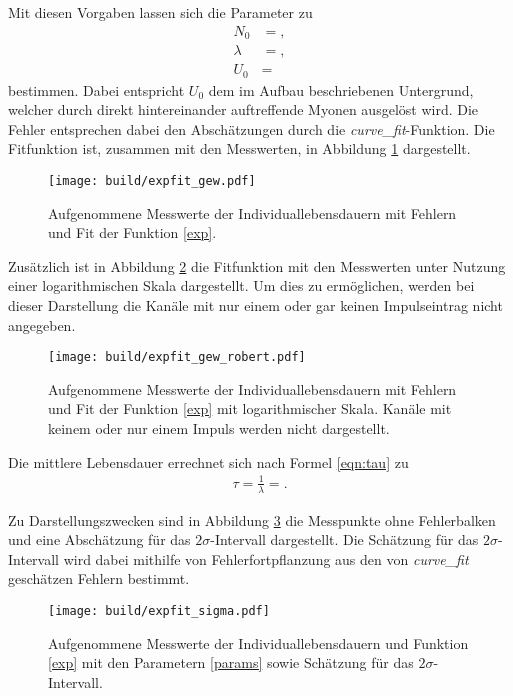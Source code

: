 Mit diesen Vorgaben lassen sich die Parameter zu
\begin{align}
  \label{params}
  N_0 &= ,\\
  \lambda &= ,\\
  U_0 &= 
\end{align}
bestimmen.
Dabei entspricht $U_0$ dem im Aufbau beschriebenen Untergrund, welcher durch direkt hintereinander auftreffende Myonen ausgelöst wird.
Die Fehler entsprechen dabei den Abschätzungen durch die \emph{curve\_fit}-Funktion.
Die Fitfunktion ist, zusammen mit den Messwerten, in Abbildung \ref{plot:punkte_err_fit} dargestellt.
\begin{figure}
  \centering
  \texttt{[image: build/expfit\_gew.pdf]}
  \caption{Aufgenommene Messwerte der Individuallebensdauern mit Fehlern und Fit der Funktion \eqref{exp}.}
  \label{plot:punkte_err_fit}
\end{figure}
Zusätzlich ist in Abbildung \ref{plot:punkte_err_fit_robert} die Fitfunktion mit den Messwerten unter Nutzung einer logarithmischen Skala dargestellt.
Um dies zu ermöglichen, werden bei dieser Darstellung die Kanäle mit nur einem oder gar keinen Impulseintrag nicht angegeben.
\begin{figure}
  \centering
  \texttt{[image: build/expfit\_gew\_robert.pdf]}
  \caption{Aufgenommene Messwerte der Individuallebensdauern mit Fehlern und Fit der Funktion \eqref{exp} mit logarithmischer Skala. Kanäle mit keinem oder nur einem Impuls werden nicht dargestellt.}
  \label{plot:punkte_err_fit_robert}
\end{figure}
Die mittlere Lebensdauer errechnet sich nach Formel \eqref{eqn:tau} zu
\begin{align}
  \label{eqn:result}
  \tau = \frac{1}{\lambda} = .
\end{align}

Zu Darstellungszwecken sind in Abbildung \ref{plot:punkte_sigma} die Messpunkte ohne Fehlerbalken und eine Abschätzung für das $2\sigma$-Intervall dargestellt.
Die Schätzung für das $2\sigma$-Intervall wird dabei mithilfe von Fehlerfortpflanzung aus den von \emph{curve\_fit} geschätzen Fehlern bestimmt.

\begin{figure}
  \centering
  \texttt{[image: build/expfit\_sigma.pdf]}
  \caption{Aufgenommene Messwerte der Individuallebensdauern und Funktion \eqref{exp} mit den Parametern \eqref{params} sowie Schätzung für das $2\sigma$-Intervall.}
  \label{plot:punkte_sigma}
\end{figure}

